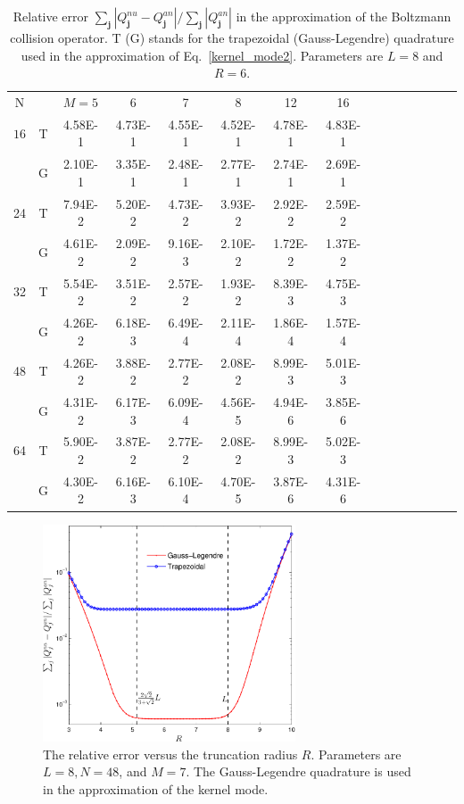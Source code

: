 \begin{table}[t]
	\centering
	\caption[Relative error in the approximation of the Boltzmann collision operator.]{Relative error $\sum_{\bm{j}}|Q_{\bm{j}}^{nu}-Q_{\bm{j}}^{an}|/\sum_{\bm{j}}|Q_{\bm{j}}^{an}|$ in the approximation of the Boltzmann collision operator. T (G) stands for the trapezoidal (Gauss-Legendre) quadrature used in the approximation of Eq.~\eqref{kernel_mode2}. Parameters are $L=8$ and $R=6$. } \label{table_coll} 
		\begin{tabular}{ccccccccccccccc}
			\hline
			N  &    & $M=5$    & 6       & 7        & 8         & 12       & 16       \\
			$16$& T  & 4.58E-1  & 4.73E-1 & 4.55E-1  & 4.52E-1   & 4.78E-1   & 4.83E-1  \\
			& G  & 2.10E-1  & 3.35E-1 & 2.48E-1  & 2.77E-1   & 2.74E-1   & 2.69E-1  \\
			24 & T  & 7.94E-2  & 5.20E-2 & 4.73E-2  & 3.93E-2   & 2.92E-2   & 2.59E-2  \\
			& G  & 4.61E-2  & 2.09E-2 & 9.16E-3  & 2.10E-2   & 1.72E-2   & 1.37E-2  \\
			32 & T  & 5.54E-2  & 3.51E-2 & 2.57E-2  & 1.93E-2   & 8.39E-3   & 4.75E-3  \\
			& G  & 4.26E-2  & 6.18E-3 & 6.49E-4  & 2.11E-4   & 1.86E-4   & 1.57E-4  \\
			48 & T  & 4.26E-2  & 3.88E-2 & 2.77E-2  & 2.08E-2   & 8.99E-3   & 5.01E-3  \\
			& G  & 4.31E-2  & 6.17E-3 & 6.09E-4  & 4.56E-5   & 4.94E-6   & 3.85E-6  \\
			64 & T  & 5.90E-2  & 3.87E-2 & 2.77E-2  & 2.08E-2   & 8.99E-3   & 5.02E-3  \\
			& G  & 4.30E-2  & 6.16E-3 & 6.10E-4  & 4.70E-5   & 3.87E-6   & 4.31E-6  \\
			\hline
		\end{tabular}
	\end{table}


\begin{figure}[t]
	\centering
	\includegraphics[width=7.5cm]{Chapter4/IMG/error_coll.pdf}
	\caption{
		The relative error versus the truncation radius $R$. Parameters are $L=8, N=48$, and $M=7$. The Gauss-Legendre quadrature is used in the approximation of the kernel mode.
	}
	\label{test_R}
\end{figure}


